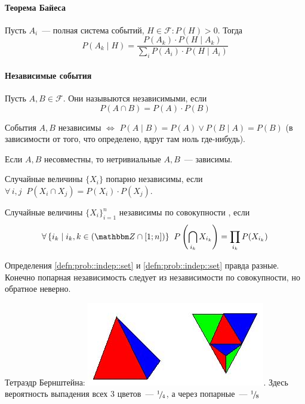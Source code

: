 \documentclass[12pt,timbord]{../../../notes}
\begin{document}
\paragraph{Теорема Байеса}
\label{par:prob::bayes}

\begin{thrm}\label{thrm:prob::bayes}
  Пусть $A_i$~--- полная система событий, $H\in \mathcal F\colon P(H)>0$. Тогда 
  \[
    P(A_k \mid H) = \frac{P(A_k)\cdot P(H \mid A_k)}{\sum_i P(A_i)\cdot P(H\mid A_i)} 
  \]
\end{thrm}

\paragraph{Независимые события}
\label{par:prob::indep}

\begin{defn}\label{defn:prob::indep::indep}
  Пусть $A, B\in \mathcal F$. Они назывыются независимыми, если 
  \[
    P(A\cap B) = P(A)\cdot P(B)
  \]
\end{defn}

\begin{prop}\label{prop:prob::indep::cond}
  События $A,B$ независимы $ \Leftrightarrow $ $P(A\mid B) = P(A) \lor P(B\mid A) = P(B)$ (в
  зависимости от того, что определено, вдруг там ноль где-нибудь).
\end{prop}
\begin{prop}\label{prop:prob::indep::zerodep}
  Если $A,B$ несовместны, то нетривиальные $A,B$~--- зависимы.
\end{prop}

\begin{defn}\label{defn:prob::indep::pair}
  Случайные величины $\{X_i\}$ попарно независимы, если $\forall\,i,j\;\; P(X_i\cap X_j) =
  P(X_i)\cdot P(X_j)$. 
\end{defn}
\begin{defn}\label{defn:prob::indep::set}
  Случайные величины $\{X_i\}_{i=1}^n$ независимы по совокупности , если \[
    \forall\,\{i_k\mid i_k,k \in (\Z\cap[1;n]) \}\;\; P\left(\bigcap_{i_k} X_{i_k}\right) 
    = \prod_{i_k}  P(X_{i_k})
  \] 
\end{defn}
\begin{rem}\label{rem:prob::indep::bern}
  Определения \ref{defn:prob::indep::set} и \ref{defn:prob::indep::set} правда разные.
  Конечно попарная независимость следует из независимости по совокупности, но обратное неверно.
\end{rem}
\begin{exmp}\label{exmp:stat::shwartz::bern}
  Тетраэдр Бернштейна:
  \includegraphics[scale=0.5]{berntetragon}. Здесь вероятность выпадения всех 3 цветов~--- ${}^{1}\!/_{\!4}$, а через попарные~--- ${}^{1}\!/_{\!8}$
\end{exmp}
\end{document}
